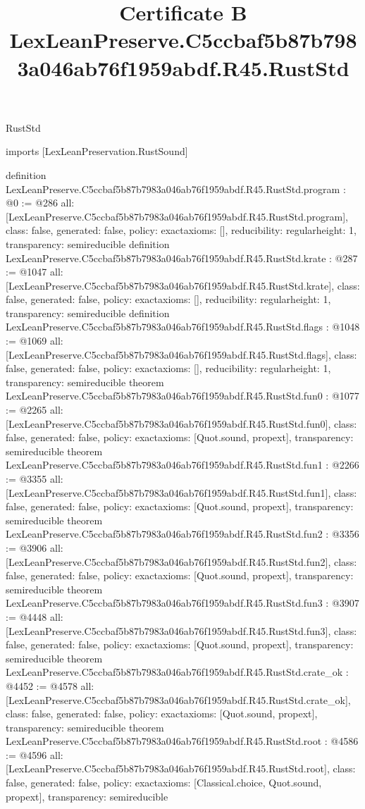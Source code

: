 \begin{lexlean}{RustStd}
\title{Certificate B LexLeanPreserve.C5ccbaf5b87b7983a046ab76f1959abdf.R45.RustStd}
\begin{coremodule}
imports [LexLeanPreservation.RustSound]

definition LexLeanPreserve.C5ccbaf5b87b7983a046ab76f1959abdf.R45.RustStd.program : @0 := @286 {
  all: [LexLeanPreserve.C5ccbaf5b87b7983a046ab76f1959abdf.R45.RustStd.program],
  class: false,
  generated: false,
  policy: exact{axioms: []},
  reducibility: regular{height: 1},
  transparency: semireducible
}
definition LexLeanPreserve.C5ccbaf5b87b7983a046ab76f1959abdf.R45.RustStd.krate : @287 := @1047 {
  all: [LexLeanPreserve.C5ccbaf5b87b7983a046ab76f1959abdf.R45.RustStd.krate],
  class: false,
  generated: false,
  policy: exact{axioms: []},
  reducibility: regular{height: 1},
  transparency: semireducible
}
definition LexLeanPreserve.C5ccbaf5b87b7983a046ab76f1959abdf.R45.RustStd.flags : @1048 := @1069 {
  all: [LexLeanPreserve.C5ccbaf5b87b7983a046ab76f1959abdf.R45.RustStd.flags],
  class: false,
  generated: false,
  policy: exact{axioms: []},
  reducibility: regular{height: 1},
  transparency: semireducible
}
theorem LexLeanPreserve.C5ccbaf5b87b7983a046ab76f1959abdf.R45.RustStd.fun0 : @1077 := @2265 {
  all: [LexLeanPreserve.C5ccbaf5b87b7983a046ab76f1959abdf.R45.RustStd.fun0],
  class: false,
  generated: false,
  policy: exact{axioms: [Quot.sound, propext]},
  transparency: semireducible
}
theorem LexLeanPreserve.C5ccbaf5b87b7983a046ab76f1959abdf.R45.RustStd.fun1 : @2266 := @3355 {
  all: [LexLeanPreserve.C5ccbaf5b87b7983a046ab76f1959abdf.R45.RustStd.fun1],
  class: false,
  generated: false,
  policy: exact{axioms: [Quot.sound, propext]},
  transparency: semireducible
}
theorem LexLeanPreserve.C5ccbaf5b87b7983a046ab76f1959abdf.R45.RustStd.fun2 : @3356 := @3906 {
  all: [LexLeanPreserve.C5ccbaf5b87b7983a046ab76f1959abdf.R45.RustStd.fun2],
  class: false,
  generated: false,
  policy: exact{axioms: [Quot.sound, propext]},
  transparency: semireducible
}
theorem LexLeanPreserve.C5ccbaf5b87b7983a046ab76f1959abdf.R45.RustStd.fun3 : @3907 := @4448 {
  all: [LexLeanPreserve.C5ccbaf5b87b7983a046ab76f1959abdf.R45.RustStd.fun3],
  class: false,
  generated: false,
  policy: exact{axioms: [Quot.sound, propext]},
  transparency: semireducible
}
theorem LexLeanPreserve.C5ccbaf5b87b7983a046ab76f1959abdf.R45.RustStd.crate_ok : @4452 := @4578 {
  all: [LexLeanPreserve.C5ccbaf5b87b7983a046ab76f1959abdf.R45.RustStd.crate_ok],
  class: false,
  generated: false,
  policy: exact{axioms: [Quot.sound, propext]},
  transparency: semireducible
}
theorem LexLeanPreserve.C5ccbaf5b87b7983a046ab76f1959abdf.R45.RustStd.root : @4586 := @4596 {
  all: [LexLeanPreserve.C5ccbaf5b87b7983a046ab76f1959abdf.R45.RustStd.root],
  class: false,
  generated: false,
  policy: exact{axioms: [Classical.choice, Quot.sound, propext]},
  transparency: semireducible
}


\end{coremodule}
\end{lexlean}
